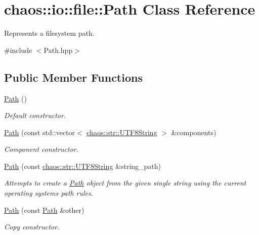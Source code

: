 \hypertarget{classchaos_1_1io_1_1file_1_1_path}{}\section{chaos\+:\+:io\+:\+:file\+:\+:Path Class Reference}
\label{classchaos_1_1io_1_1file_1_1_path}


Represents a filesystem path.  




{\ttfamily \#include $<$Path.\+hpp$>$}

\subsection*{Public Member Functions}
\begin{DoxyCompactItemize}
\item 
\hyperlink{classchaos_1_1io_1_1file_1_1_path_ae221e8dceeedda7ef0376e408a33b388}{Path} ()
\begin{DoxyCompactList}\small\item\em Default constructor. \end{DoxyCompactList}\item 
\hyperlink{classchaos_1_1io_1_1file_1_1_path_a2f99e6ecbc8012c704a7d59a82e44d7e}{Path} (const std\+::vector$<$ \hyperlink{classchaos_1_1str_1_1_u_t_f8_string}{chaos\+::str\+::\+U\+T\+F8\+String} $>$ \&components)
\begin{DoxyCompactList}\small\item\em Component constructor. \end{DoxyCompactList}\item 
\hyperlink{classchaos_1_1io_1_1file_1_1_path_aab391627caf2837f21ee59520a4f7363}{Path} (const \hyperlink{classchaos_1_1str_1_1_u_t_f8_string}{chaos\+::str\+::\+U\+T\+F8\+String} \&string\+\_\+path)
\begin{DoxyCompactList}\small\item\em Attempts to create a \hyperlink{classchaos_1_1io_1_1file_1_1_path}{Path} object from the given single string using the current operating system\textquotesingle{}s path rules. \end{DoxyCompactList}\item 
\hyperlink{classchaos_1_1io_1_1file_1_1_path_a888031f678ac29c3c068c7c710057809}{Path} (const \hyperlink{classchaos_1_1io_1_1file_1_1_path}{Path} \&other)
\begin{DoxyCompactList}\small\item\em Copy constructor. \end{DoxyCompactList}\item 

\end{DoxyCompactItemize}
